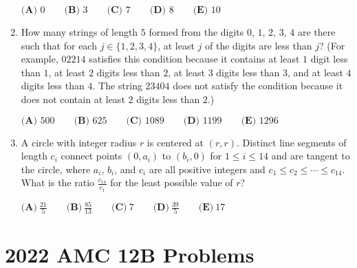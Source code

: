 \documentclass{article}
\begin{document}
\begin{enumerate}[label=\arabic*., itemsep=0.5em]
\(\textbf{(A) }0 \qquad\textbf{(B) }3 \qquad\textbf{(C) }7 \qquad\textbf{(D) }8\qquad\textbf{(E) }10\)\par \vspace{0.5em}\item How many strings of length \(5\) formed from the digits \(0\), \(1\), \(2\), \(3\), \(4\) are there such that for each \(j \in \{1,2,3,4\}\), at least \(j\) of the digits are less than \(j\)? (For example, \(02214\) satisfies this condition
because it contains at least \(1\) digit less than \(1\), at least \(2\) digits less than \(2\), at least \(3\) digits less
than \(3\), and at least \(4\) digits less than \(4\). The string \(23404\) does not satisfy the condition because it
does not contain at least \(2\) digits less than \(2\).)

\(\textbf{(A) }500\qquad\textbf{(B) }625\qquad\textbf{(C) }1089\qquad\textbf{(D) }1199\qquad\textbf{(E) }1296\)\par \vspace{0.5em}\item A circle with integer radius \(r\) is centered at \((r, r)\). Distinct line segments of length \(c_i\) connect points \((0, a_i)\) to \((b_i, 0)\) for \(1 \le i \le 14\) and are tangent to the circle, where \(a_i\), \(b_i\), and \(c_i\) are all positive integers and \(c_1 \le c_2 \le \cdots \le c_{14}\). What is the ratio \(\frac{c_{14}}{c_1}\) for the least possible value of \(r\)?

\(\textbf{(A)} ~\frac{21}{5} \qquad\textbf{(B)} ~\frac{85}{13} \qquad\textbf{(C)} ~7 \qquad\textbf{(D)} ~\frac{39}{5} \qquad\textbf{(E)} ~17 \)\par \vspace{0.5em}\end{enumerate}\newpage\section*{2022 AMC 12B Problems}
\end{document}

